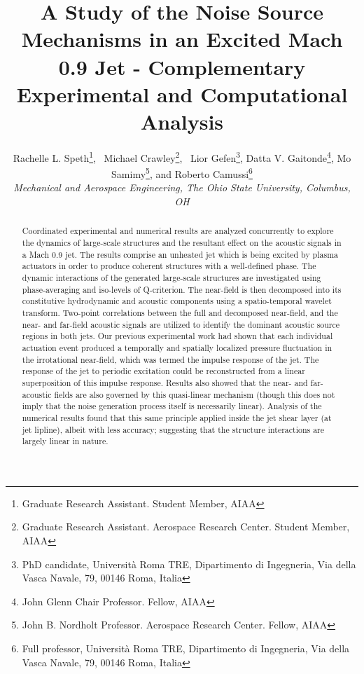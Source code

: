 \documentclass[english]{aiaa-tc}
\begin{document}
\title{A Study of the Noise Source Mechanisms in an Excited Mach 0.9 Jet - Complementary Experimental and Computational Analysis}


\author{Rachelle L. Speth\thanks{Graduate Research Assistant. Student Member, AIAA}, \
Michael Crawley\thanks{Graduate Research Assistant. Aerospace Research Center. Student Member, AIAA}, \
Lior Gefen\thanks{PhD candidate, Università Roma TRE, Dipartimento di Ingegneria, Via della Vasca Navale, 79, 00146 Roma, Italia},
 Datta V. Gaitonde\thanks{John Glenn Chair Professor. Fellow, AIAA},
 Mo Samimy\thanks{John B. Nordholt Professor. Aerospace Research Center. Fellow, AIAA},
 and Roberto Camussi\thanks{Full professor, Università Roma TRE, Dipartimento di Ingegneria, Via della Vasca Navale, 79, 00146 Roma, Italia}
\\\normalsize\itshape Mechanical and Aerospace Engineering, The Ohio State University, Columbus, OH \\}


\maketitle

\begin{abstract}
Coordinated experimental and numerical results are analyzed concurrently to explore the dynamics of large-scale structures and the resultant effect on the acoustic signals in a Mach 0.9 jet.
The results comprise an unheated jet which is being excited by plasma actuators in order to produce coherent structures with a well-defined phase.
The dynamic interactions of the generated large-scale structures are investigated using phase-averaging and iso-levels of Q-criterion.
The near-field is then decomposed into its constitutive hydrodynamic and acoustic components using a spatio-temporal wavelet transform.
Two-point correlations between the full and decomposed near-field, and the near- and far-field acoustic signals are utilized to identify the dominant acoustic source regions in both jets.
Our previous experimental work had shown that each individual actuation event produced a temporally and spatially localized pressure fluctuation in the irrotational near-field, which was termed the impulse response of the jet. The response of the jet to periodic excitation could be reconstructed from a linear superposition of this impulse response.
Results also showed that the near- and far-acoustic fields are also governed by this quasi-linear mechanism (though this does not imply that the noise generation process itself is necessarily linear).
Analysis of the numerical results found that this same principle applied inside the jet shear layer (at jet lipline), albeit with less accuracy; suggesting that the structure interactions are largely linear in nature.


\end{abstract}
\end{document}

